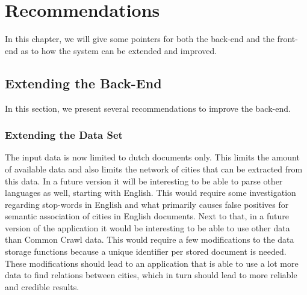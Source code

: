 \chapter{Recommendations}\label{sec:recommendations}
In this chapter, we will give some pointers for both the back-end and the front-end as to how the system can be extended and improved.

 
\section{Extending the Back-End}
In this section, we present several recommendations to improve the back-end.

\subsection{Extending the Data Set}
The input data is now limited to dutch documents only. This limits the amount of available data and also limits the network of cities that can be extracted from this data. In a future version it will be interesting to be able to parse other languages as well, starting with English. This would require some investigation regarding stop-words in English and what primarily causes false positives for semantic association of cities in English documents. Next to that, in a future version of the application it would be interesting to be able to use other data than Common Crawl data. This would require a few modifications to the data storage functions because a unique identifier per stored document is needed. These modifications should lead to an application that is able to use a lot more data to find relations between cities, which in turn should lead to more reliable and credible results.


